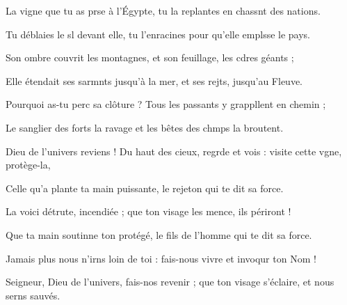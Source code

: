 \item La vigne que tu as prse à l’Égypte,\psstar{} tu la replantes en chassnt des nations.
\item Tu déblaies le sl devant elle,\psstar{} tu l’enracines pour qu’elle emplsse le pays.
\item Son ombre couvrit les montagnes,\psstar{} et son feuillage, les cdres géants ;
\item Elle étendait ses sarmnts jusqu’à la mer,\psstar{} et ses rejts, jusqu’au Fleuve.
\item Pourquoi as-tu perc sa clôture ?\psstar{} Tous les passants y grappllent en chemin ;
\item Le sanglier des forts la ravage\psstar{} et les bêtes des chmps la broutent.
\item Dieu de l’univers reviens !\pscross{} Du haut des cieux, regrde et vois :\psstar{} visite cette vgne, protège-la,
\item Celle qu’a plante ta main puissante,\psstar{} le rejeton qui te dit sa force.
\item La voici détrute, incendiée ;\psstar{} que ton visage les mence, ils périront !
\item Que ta main soutinne ton protégé,\psstar{} le fils de l’homme qui te dit sa force.
\item Jamais plus nous n’irns loin de toi :\psstar{} fais-nous vivre et invoqur ton Nom !
\item Seigneur, Dieu de l’univers, fais-nos revenir ;\psstar{} que ton visage s’éclaire, et nous serns sauvés.